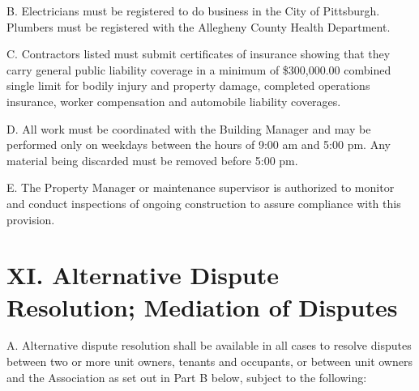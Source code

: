 \documentclass[
  14pt,
]{book}
\begin{document}
B. Electricians must be registered to do business in the City of Pittsburgh. Plumbers must be registered with the Allegheny County Health Department.

C. Contractors listed must submit certificates of insurance showing that they carry general public liability coverage in a minimum of \$300,000.00 combined single limit for bodily injury and property damage, completed operations insurance, worker compensation and automobile liability coverages.

D. All work must be coordinated with the Building Manager and may be performed only on weekdays between the hours of 9:00 am and 5:00 pm. Any material being discarded must be removed before 5:00 pm.

E. The Property Manager or maintenance supervisor is authorized to monitor and conduct inspections of ongoing construction to assure compliance with this provision.

\hypertarget{xi.-alternative-dispute-resolution-mediation-of-disputes}{%
\section*{XI. Alternative Dispute Resolution; Mediation of Disputes}\label{xi.-alternative-dispute-resolution-mediation-of-disputes}}

A. Alternative dispute resolution shall be available in all cases to resolve disputes between two or more unit owners, tenants and occupants, or between unit owners and the Association as set out in Part B below, subject to the following:
\end{document}
